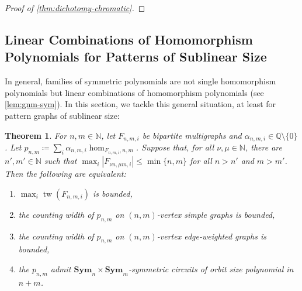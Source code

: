 \documentclass[10pt,a4paper]{article}
\theoremstyle{definition}
\theoremstyle{plain}
\newtheorem{theorem}[definition]{Theorem}
\theoremstyle{remark}
\DeclareMathOperator{\tw}{tw}
\newcommand{\Sym}{\mathbf{Sym}}
\begin{document}
\begin{proof}[Proof of \cref{thm:dichotomy-chromatic}]
%		
	\end{proof}
	
	\subsection{Linear Combinations of Homomorphism Polynomials for Patterns of Sublinear Size}
	
	In general, families of symmetric polynomials are not single homomorphism polynomials but linear combinations of homomorphism polynomials (see \cref{lem:gnm-sym}).
	In this section, we tackle this general situation, at least for pattern graphs of sublinear size:
	
	\begin{theorem}
		\label{thm:lincomb}
		For $n,m \in \mathbb{N}$, 
		let $F_{n,m,i}$ be bipartite multigraphs and $\alpha_{n,m,i} \in \mathbb{Q} \setminus \{0\}$.
		Let $p_{n,m} \coloneqq \sum_i \alpha_{n,m,i} \hom_{F_{n,m,i}, n,m}$.
		Suppose that, for all $\nu, \mu \in \mathbb{N}$,
		there are $n', m' \in \mathbb{N}$ 
		such that $\max_i |F_{\nu n, \mu m,i}| \leq \min \{n,m\}$ for all $n > n'$ and $m > m'$.		
		Then the following are equivalent:
		\begin{enumerate}
			\item\label{it:lincomb1} $\max_i \tw(F_{n,m,i})$ is bounded,
			\item\label{it:lincomb2} the counting width of $p_{n,m}$ on $(n,m)$-vertex simple graphs is bounded,
			\item the counting width of $p_{n,m}$ on $(n,m)$-vertex edge-weighted graphs is bounded,
			\item the $p_{n,m}$ admit $\Sym_n\times \Sym_m$-symmetric circuits of orbit size polynomial in $n+m$.
		\end{enumerate}
	\end{theorem}
	
\end{document}
